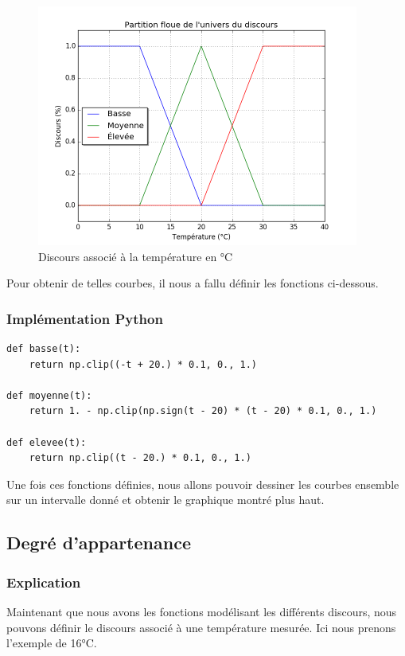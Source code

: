 \documentclass[a4paper]{article}
\begin{document}
\begin{figure}[h]
\begin{center}
	\includegraphics[width=400px]{plot_3.png}
\end{center}
\caption{Discours associé à la température en °C}
\end{figure}

Pour obtenir de telles courbes, il nous a fallu définir les fonctions ci-dessous.

\subsubsection{Implémentation Python}
\begin{lstlisting}
def basse(t):
    return np.clip((-t + 20.) * 0.1, 0., 1.)

def moyenne(t):
    return 1. - np.clip(np.sign(t - 20) * (t - 20) * 0.1, 0., 1.)

def elevee(t):
    return np.clip((t - 20.) * 0.1, 0., 1.)
\end{lstlisting}

Une fois ces fonctions définies, nous allons pouvoir dessiner les courbes ensemble sur un intervalle donné et obtenir le graphique montré plus haut.

\subsection{Degré d'appartenance}

\subsubsection{Explication}
Maintenant que nous avons les fonctions modélisant les différents discours, nous pouvons définir le discours associé à une température mesurée.
Ici nous prenons l'exemple de 16°C.
\end{document}
